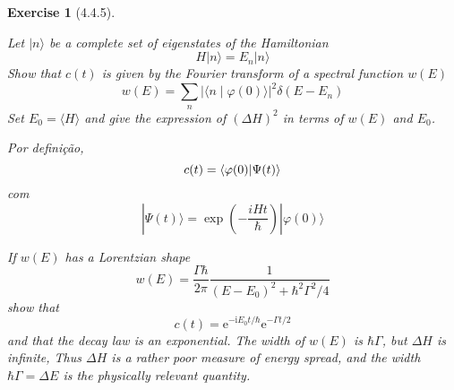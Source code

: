 \documentclass[12pt]{article}
\def\be{\begin{equation}}
\def\ee{\end{equation}}
\newtheorem{exercise}{Exercise}
\begin{document}
\begin{exercise}[4.4.5]
\begin{exercises}
			\item Let $|n\rangle$ be a complete set of eigenstates of the Hamiltonian
			$$
			H|n\rangle=E_{n}|n\rangle
			$$
			Show that $c(t)$ is given by the Fourier transform of a spectral function $w(E)$
			$$
			w(E)=\sum_{n}|\langle n \mid \varphi(0)\rangle|^{2} \delta\left(E-E_{n}\right)
			$$
			Set $E_{0}=\langle H\rangle$ and give the expression of $(\Delta H)^{2}$ in terms of $w(E)$ and $E_{0}$.
			\begin{multianswer}
				Por definição,
				\be
					c(t)=\braket{\varphi(0) | \Psi(t)}
				\ee
				com
				\be
					|\Psi(t)\rangle=\exp \left(-\frac{i H t}{\hbar}\right)|\varphi(0)\rangle
				\ee
				
			\end{multianswer}
		
			\item If $w(E)$ has a Lorentzian shape
			$$
			w(E)=\frac{\Gamma \hbar}{2 \pi} \frac{1}{\left(E-E_{0}\right)^{2}+\hbar^{2} \Gamma^{2} / 4}
			$$
			show that
			$$
			c(t)=\mathrm{e}^{-\mathrm{i} E_{0} t / \hbar} \mathrm{e}^{-\Gamma t / 2}
			$$
			and that the decay law is an exponential. The width of $w(E)$ is $\hbar \Gamma$, but $\Delta H$ is infinite, Thus $\Delta H$ is a rather poor measure of energy spread, and the width $\hbar \Gamma=\Delta E$ is the physically relevant quantity.
			\begin{multianswer}[true]
				
			\end{multianswer}
			
		\end{exercises}
	
		
		
	\end{exercise}
	
\end{document}
